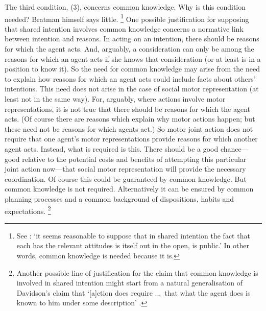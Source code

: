 \documentclass[12pt,\papersize]{extarticle}
\begin{document}
The third condition, (3), concerns common knowledge.
Why is this condition needed?
Bratman himself says little.%
\footnote{
See \citet[p.\ 117]{Bratman:1993je}:
`it seems reasonable to suppose that in shared intention the fact that each has the relevant attitudes is itself out in the open, is public.' 
In other words, common knowledge is needed because it is.
}
One possible justification for supposing that shared intention involves common knowledge concerns a normative link between intention and reasons.
In acting on an intention, there should be reasons for which the  agent acts.
And, arguably, a consideration can only be among the reasons for which an agent acts if she knows that consideration (or at least is in a position to know it).
So the need for common knowledge may arise from the need to explain how reasons for which an agent acts could include facts about others' intentions.
This need does not arise in the case of social motor representation (at least not in the same way).
For, arguably, where actions involve motor representations, it is not true that there should be reasons for which the agent acts.
(Of course there are reasons which explain why motor actions happen; but these need not be reasons for which agents act.)
So motor joint action does not require that one agent's motor representations provide reasons for which another agent acts.
Instead, what is required is this.
There should be a good chance---good relative to the potential costs and benefits of attempting this particular joint action now---that social motor representation will provide the necessary coordination.
Of course this could be guaranteed by common knowledge. 
But common knowledge is not required.
Alternatively it can be ensured by common planning processes and a common {background} of dispositions, habits and expectations.%
\footnote{
Another possible line of justification for the claim that common knowledge is involved in shared intention might start from a natural generalisation of Davidson's claim that
`[a]ction does require %
...\ that what the agent does is known to him under some description' \citep[p.\ 50]{Davidson:1971fz}. 
} 
\end{document}
